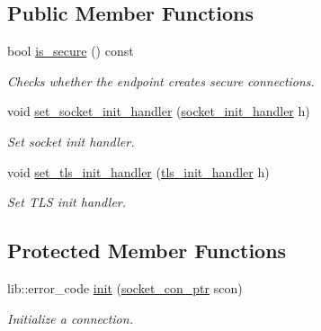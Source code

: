 \subsection*{Public Member Functions}
\begin{DoxyCompactItemize}
\item 
bool \mbox{\hyperlink{classwebsocketpp_1_1transport_1_1asio_1_1tls__socket_1_1endpoint_aaaf0047506bbbd83d2da026970fc3bf8}{is\+\_\+secure}} () const
\begin{DoxyCompactList}\small\item\em Checks whether the endpoint creates secure connections. \end{DoxyCompactList}\item 
void \mbox{\hyperlink{classwebsocketpp_1_1transport_1_1asio_1_1tls__socket_1_1endpoint_ae9466b3c3169eb1757ca64a1462ac86e}{set\+\_\+socket\+\_\+init\+\_\+handler}} (\mbox{\hyperlink{namespacewebsocketpp_1_1transport_1_1asio_1_1tls__socket_a0ec24de8bf054a4bc6f6c018e743efea}{socket\+\_\+init\+\_\+handler}} h)
\begin{DoxyCompactList}\small\item\em Set socket init handler. \end{DoxyCompactList}\item 
void \mbox{\hyperlink{classwebsocketpp_1_1transport_1_1asio_1_1tls__socket_1_1endpoint_aaa8973ceabe2423f535f6cfd2f7cbd53}{set\+\_\+tls\+\_\+init\+\_\+handler}} (\mbox{\hyperlink{namespacewebsocketpp_1_1transport_1_1asio_1_1tls__socket_a6fe279813cc19b05a3897d20f10f16d2}{tls\+\_\+init\+\_\+handler}} h)
\begin{DoxyCompactList}\small\item\em Set T\+LS init handler. \end{DoxyCompactList}\end{DoxyCompactItemize}
\subsection*{Protected Member Functions}
\begin{DoxyCompactItemize}
\item 
lib\+::error\+\_\+code \mbox{\hyperlink{classwebsocketpp_1_1transport_1_1asio_1_1tls__socket_1_1endpoint_a3fcd99c817947b9e23f0438c976edc64}{init}} (\mbox{\hyperlink{classwebsocketpp_1_1transport_1_1asio_1_1tls__socket_1_1endpoint_ad0babd14e53524633840467d072710c3}{socket\+\_\+con\+\_\+ptr}} scon)
\begin{DoxyCompactList}\small\item\em Initialize a connection. \end{DoxyCompactList}\end{DoxyCompactItemize}


